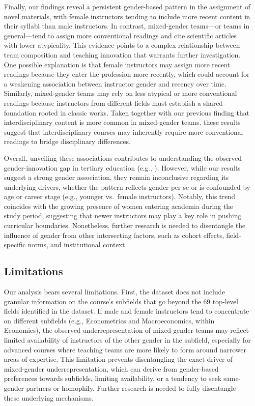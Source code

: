 \documentclass[
  11pt,
]{article}
\begin{document}
Finally, our findings reveal a persistent gender-based pattern in the assignment of novel materials, with female instructors tending to include more recent content in their syllabi than male instructors. In contrast, mixed-gender teams---or teams in general---tend to assign more conventional readings and cite scientific articles with lower atypicality. This evidence points to a complex relationship between team composition and teaching innovation that warrants further investigation. One possible explanation is that female instructors may assign more recent readings because they enter the profession more recently, which could account for a weakening association between instructor gender and recency over time. Similarly, mixed-gender teams may rely on less atypical or more conventional readings because instructors from different fields must establish a shared foundation rooted in classic works. Taken together with our previous finding that interdisciplinary content is more common in mixed-gender teams, these results suggest that interdisciplinary courses may inherently require more conventional readings to bridge disciplinary differences.

Overall, unveiling these associations contributes to understanding the observed gender-innovation gap in tertiary education (e.g., ). However, while our results suggest a strong gender association, they remain inconclusive regarding its underlying drivers, whether the pattern reflects gender per se or is confounded by age or career stage (e.g., younger vs.~female instructors). Notably, this trend coincides with the growing presence of women entering academia during the study period, suggesting that newer instructors may play a key role in pushing curricular boundaries. Nonetheless, further research is needed to disentangle the influence of gender from other intersecting factors, such as cohort effects, field-specific norms, and institutional context.

\subsection{Limitations}\label{limitations}

Our analysis bears several limitations. First, the dataset does not include granular information on the course's subfields that go beyond the 69 top-level fields identified in the dataset. If male and female instructors tend to concentrate on different subfields (e.g., Econometrics and Macroeconomics, within Economics), the observed underrepresentation of mixed-gender teams may reflect limited availability of instructors of the other gender in the subfield, especially for advanced courses where teaching teams are more likely to form around narrower areas of expertise. This limitation prevents disentangling the exact driver of mixed-gender underrepresentation, which can derive from gender-based preferences towards subfields, limiting availability, or a tendency to seek same-gender partners or homophily. Further research is needed to fully disentangle these underlying mechanisms.
\end{document}
